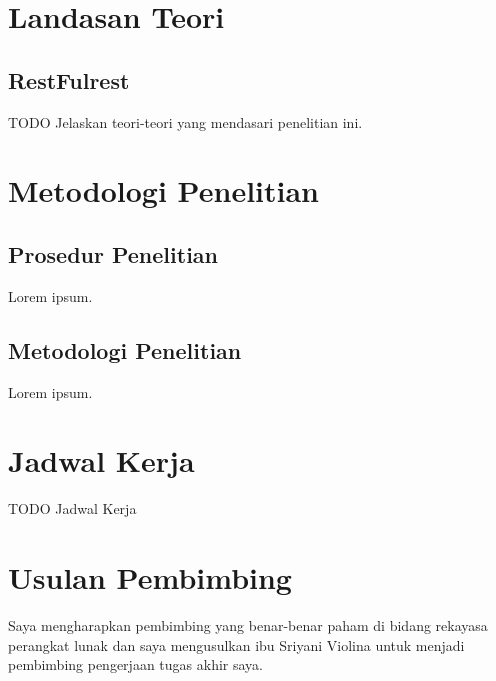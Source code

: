 \documentclass[a4paper, 12pt]{report}
\begin{document}
\section*{Landasan Teori}
\subsection*{RestFulrest}
\begin{flushleft}
TODO Jelaskan teori-teori yang mendasari penelitian ini.
\end{flushleft}

\section*{Metodologi Penelitian}

\subsection*{Prosedur Penelitian}
\begin{flushleft}
Lorem ipsum.
\end{flushleft}

\subsection*{Metodologi Penelitian}
\begin{flushleft}
Lorem ipsum.
\end{flushleft}

\section*{Jadwal Kerja}
\begin{flushleft}
TODO Jadwal Kerja
\end{flushleft}

\section*{Usulan Pembimbing}
Saya mengharapkan pembimbing yang benar-benar paham di bidang rekayasa perangkat lunak dan saya mengusulkan ibu Sriyani Violina untuk menjadi pembimbing pengerjaan tugas akhir saya.
\end{document}
